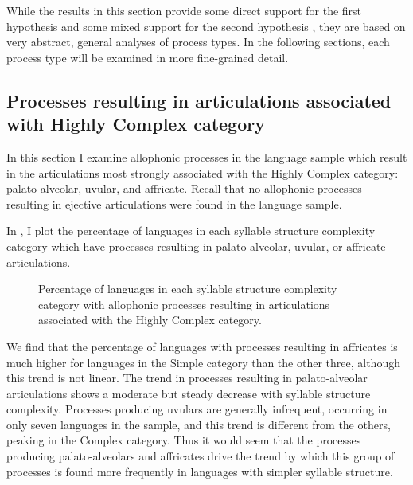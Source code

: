   While the results in this section provide some direct support for the first hypothesis  and some mixed support for the second hypothesis , they are based on very abstract, general analyses of process types. In the following sections, each process type will be examined in more fine-grained detail.

\subsection{Processes resulting in articulations associated with Highly Complex category}\label{sec:7.3.2}

  In this section I examine allophonic processes in the language sample which result in the articulations most strongly associated with the Highly Complex category: palato-alveolar, uvular, and affricate. Recall that no allophonic processes resulting in ejective articulations were found in the language sample.

  In , I plot the percentage of languages in each syllable structure complexity category which have processes resulting in palato-alveolar, uvular, or affricate articulations.

\begin{figure}
\caption{\label{fig:7.6}Percentage of languages in each syllable structure complexity category with allophonic processes resulting in articulations associated with the Highly Complex category.}
\end{figure}
  We find that the percentage of languages with processes resulting in affricates is much higher for languages in the Simple category than the other three, although this trend is not linear. The trend in processes resulting in palato-alveolar articulations shows a moderate but steady decrease with syllable structure complexity. Processes producing uvulars are generally infrequent, occurring in only seven languages in the sample, and this trend is different from the others, peaking in the Complex category. Thus it would seem that the processes producing pa\-la\-to-alveolars and affricates drive the trend by which this group of processes is found more frequently in languages with simpler syllable structure.

